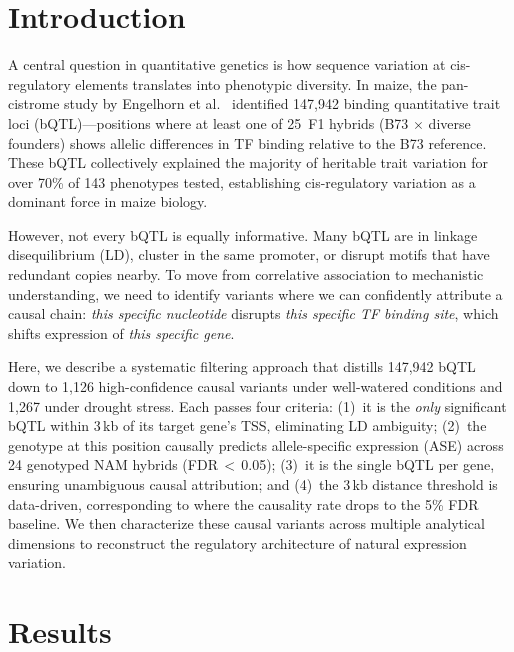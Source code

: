 \documentclass[11pt,a4paper]{article}
\begin{document}
\section{Introduction}

A central question in quantitative genetics is how sequence variation at
cis-regulatory elements translates into phenotypic diversity. In maize, the
pan-cistrome study by Engelhorn et al.\ \citep{engelhorn2025} identified
147,942 binding quantitative trait loci (bQTL)---positions where at least one
of 25~F1 hybrids (B73 $\times$ diverse founders) shows allelic differences in
TF binding relative to the B73 reference. These bQTL collectively explained
the majority of heritable trait variation for over 70\% of 143 phenotypes
tested, establishing cis-regulatory variation as a dominant force in maize
biology.

However, not every bQTL is equally informative. Many bQTL are in linkage
disequilibrium (LD), cluster in the same promoter, or disrupt motifs that have
redundant copies nearby. To move from correlative association to mechanistic
understanding, we need to identify variants where we can confidently attribute
a causal chain: \emph{this specific nucleotide} disrupts \emph{this specific
TF binding site}, which shifts expression of \emph{this specific gene}.

Here, we describe a systematic filtering approach that distills 147,942 bQTL
down to 1,126 high-confidence causal variants under well-watered conditions
and 1,267 under drought stress. Each passes four criteria: (1)~it is the
\emph{only} significant bQTL within 3\,kb of its target gene's TSS,
eliminating LD ambiguity; (2)~the genotype at this position causally predicts
allele-specific expression (ASE) across 24 genotyped NAM hybrids
(FDR\,$<$\,0.05); (3)~it is the single bQTL per gene, ensuring unambiguous
causal attribution; and (4)~the 3\,kb distance threshold is data-driven,
corresponding to where the causality rate drops to the 5\% FDR baseline.
We then characterize these causal variants across multiple analytical
dimensions to reconstruct the regulatory architecture of natural expression
variation.


\section{Results}
\end{document}
